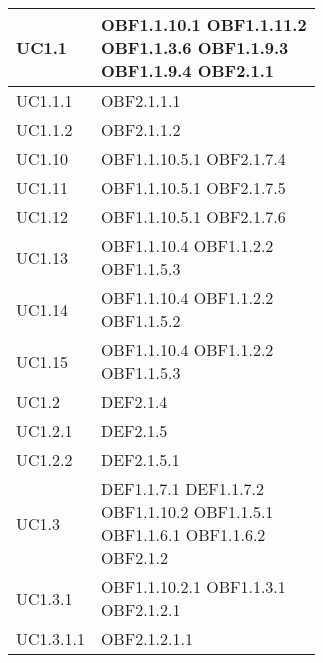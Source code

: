 \documentclass{scalatekids-article}
\begin{document}
\begin{longtable}[H]{|p{5.5cm}|p{5.5cm}|}
  \hline
  UC1.1 & \multiLineCell[t]{OBF1.1.10.1 OBF1.1.11.2\\OBF1.1.3.6 OBF1.1.9.3\\OBF1.1.9.4 OBF2.1.1\\}\\
  \hline
  UC1.1.1 & \multiLineCell[t]{OBF2.1.1.1\\}\\
  \hline
  UC1.1.2 & \multiLineCell[t]{OBF2.1.1.2\\}\\
  \hline
  UC1.10 & \multiLineCell[t]{OBF1.1.10.5.1 OBF2.1.7.4\\}\\
  \hline
  UC1.11 & \multiLineCell[t]{OBF1.1.10.5.1 OBF2.1.7.5\\}\\
  \hline
  UC1.12 & \multiLineCell[t]{OBF1.1.10.5.1 OBF2.1.7.6\\}\\
  \hline
  UC1.13 & \multiLineCell[t]{OBF1.1.10.4 OBF1.1.2.2\\OBF1.1.5.3\\}\\
  \hline
  UC1.14 & \multiLineCell[t]{OBF1.1.10.4 OBF1.1.2.2\\OBF1.1.5.2\\}\\
  \hline
  UC1.15 & \multiLineCell[t]{OBF1.1.10.4 OBF1.1.2.2\\OBF1.1.5.3\\}\\
  \hline
  UC1.2 & \multiLineCell[t]{DEF2.1.4\\}\\
  \hline
  UC1.2.1 & \multiLineCell[t]{DEF2.1.5\\}\\
  \hline
  UC1.2.2 & \multiLineCell[t]{DEF2.1.5.1\\}\\
  \hline
  UC1.3 & \multiLineCell[t]{DEF1.1.7.1 DEF1.1.7.2\\OBF1.1.10.2 OBF1.1.5.1\\OBF1.1.6.1 OBF1.1.6.2\\OBF2.1.2\\}\\
  \hline
  UC1.3.1 & \multiLineCell[t]{OBF1.1.10.2.1 OBF1.1.3.1\\OBF2.1.2.1\\}\\
  \hline
  UC1.3.1.1 & \multiLineCell[t]{OBF2.1.2.1.1\\}\\

\end{longtable}
\end{document}
